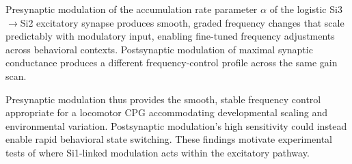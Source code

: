 Presynaptic modulation of the accumulation rate parameter $\alpha$ of the logistic Si3$\to$Si2 excitatory synapse produces smooth, graded frequency changes that scale predictably with modulatory input, enabling fine-tuned frequency adjustments across behavioral contexts.
Postsynaptic modulation of maximal synaptic conductance produces a different frequency-control profile across the same gain scan.

Presynaptic modulation thus provides the smooth, stable frequency control appropriate for a locomotor CPG accommodating developmental scaling and environmental variation.
Postsynaptic modulation's high sensitivity could instead enable rapid behavioral state switching.
These findings motivate experimental tests of where Si1-linked modulation acts within the excitatory pathway.

